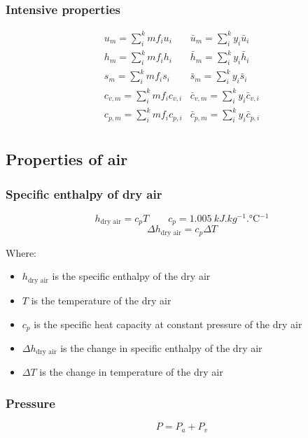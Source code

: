 \documentclass[11pt]{article}
\begin{document}
\subsubsection{Intensive properties}
\label{sec:orgba3ba3f}
\begin{displaymath}
\begin{array}{c|c}
u_m = \sum_i^k mf_i u_i & \bar{u}_m = \sum_i^k y_i \bar{u}_i \\
h_m = \sum_i^k mf_i h_i & \bar{h}_m = \sum_i^k y_i \bar{h}_i \\
s_m = \sum_i^k mf_i s_i & \bar{s}_m = \sum_i^k y_i \bar{s}_i \\
c_{v,m} = \sum_i^k mf_i c_{v,i} & \bar{c}_{v,m} = \sum_i^k y_i \bar{c}_{v,i} \\
c_{p,m} = \sum_i^k mf_i c_{p,i} & \bar{c}_{p,m} = \sum_i^k y_i \bar{c}_{p,i} \\
\end{array}
\end{displaymath}

 \newpage
\subsection{Properties of air}
\label{sec:org40b3562}

\subsubsection{Specific enthalpy of dry air}
\label{sec:org552818d}
\[h_{\text{dry air}} = c_p T \qquad c_p = \qty{1.005}{kJ.kg^{-1}.\degreeCelsius^{-1}}\]
\[\Delta h_{\text{dry air}} = c_p \Delta T\]

Where:
\begin{itemize}
\item \(h_{\text{dry air}}\) is the specific enthalpy of the dry air
\item \(T\) is the temperature of the dry air
\item \(c_p\) is the specific heat capacity at constant pressure of the dry air
\item \(\Delta h_{\text{dry air}}\) is the change in specific enthalpy of the dry air
\item \(\Delta T\) is the change in temperature of the dry air
\end{itemize}
\subsubsection{Pressure}
\label{sec:org7014973}
\[P = P_a + P_v\]
\end{document}
